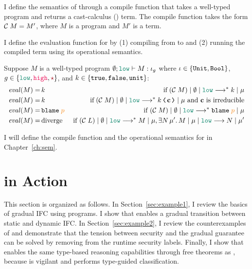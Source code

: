 
I define the semantics of \Surface through a compile function that takes a
well-typed \Surface program and returns a cast-calculus (\CC) term. The compile
function takes the form $\mathcal{C}\;{M} = M'$, where $M$ is a \Surface program and
$M'$ is a \CC term.

I define the evaluation function for \Surface by (1) compiling from \Surface to
\CC and (2) running the compiled \CC term using its operational semantics.

Suppose $M$ is a well-typed \Surface program $\emptyset ; \low \vdash M :
\iota_g$ where $\iota \in \{\mathtt{Unit}, \mathtt{Bool}\}$, $g \in \{\low, \high, \unk\}$, and
$k \in \{\mathtt{true}, \mathtt{false}, \mathtt{unit}\}$:
\begin{align*}
  \mathit{eval}(M) =&\,k\;&\text{if}\;\reducemult{(\compile{M})}{\emptyset}{\low}{k}{\mu} \\
  \mathit{eval}(M) =&\,k\;&\text{if}\;\reducemult{(\compile{M})}{\emptyset}{\low}{\cccast{k}{\mathbf{c}}}{\mu}\text{~and $\mathbf{c}$ is irreducible} \\
  \mathit{eval}(M) =&\,\blame{\bl{p}}\;&\text{if~}\reducemult{(\compile{M})}{\emptyset}{\low}{\blame{\bl{p}}}{\mu} \\
  \mathit{eval}(M) =&\,\text{diverge}\;&\text{if~}\reducemult{(\compile{L})}{\emptyset}{\low}{M}{\mu}, \exists N\,\mu'.\,\reduce{M}{\mu}{\low}{N}{\mu'}
\end{align*}

I will define the compile function and the operational semantics for \CC in
Chapter~\ref{ch:sem}.

\section{\Surface in Action}
\label{sec:examples}

This section is organized as follows. In Section~\ref{sec:example1}, I review
the basics of gradual IFC using \Surface programs. I show that \Surface enables
a gradual transition between static and dynamic IFC. In
Section~\ref{sec:example2}, I review the counterexamples of
\textcite{Toro:2018aa} and demonstrate that the tension between security and the
gradual guarantee can be solved by removing \unk from the runtime security
labels. Finally, I show that \Surface enables the same type-based reasoning
capabilities through free theorems as \GSLRef, because \Surface is vigilant and
performs type-guided classification.

